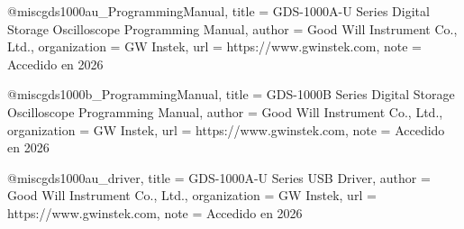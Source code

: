 @misc{gds1000au_ProgrammingManual,
  title        = {GDS-1000A-U Series Digital Storage Oscilloscope Programming Manual},
  author       = {{Good Will Instrument Co., Ltd.}},
  organization = {GW Instek},
  url          = {https://www.gwinstek.com},
  note         = {Accedido en 2026}
}

@misc{gds1000b_ProgrammingManual,
  title        = {GDS-1000B Series Digital Storage Oscilloscope Programming Manual},
  author       = {{Good Will Instrument Co., Ltd.}},
  organization = {GW Instek},
  url          = {https://www.gwinstek.com},
  note         = {Accedido en 2026}
}

@misc{gds1000au_driver,
  title        = {GDS-1000A-U Series USB Driver},
  author       = {{Good Will Instrument Co., Ltd.}},
  organization = {GW Instek},
  url          = {https://www.gwinstek.com},
  note         = {Accedido en 2026}
}
